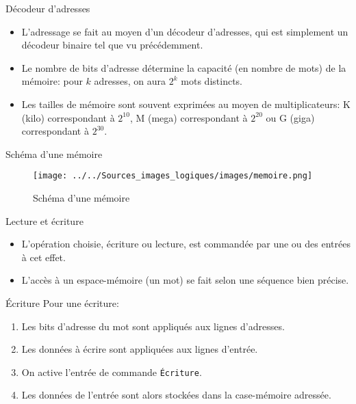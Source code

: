 \documentclass[presentation]{beamer}
\begin{document}
\begin{frame}[label={sec:orgab3ce34}]{Décodeur d'adresses}
\begin{itemize}
\item L'adressage se fait au moyen d'un \alert{décodeur d'adresses}, qui est simplement un décodeur binaire tel que vu précédemment.

\item Le nombre de bits d'adresse détermine la capacité (en nombre de mots) de la mémoire: pour \(k\) adresses, on aura \(2^k\) mots distincts.

\item Les tailles de mémoire sont souvent exprimées au moyen de multiplicateurs: K (kilo) correspondant à \(2^{10}\), M (mega) correspondant à \(2^{20}\) ou G (giga) correspondant à \(2^{30}\).
\end{itemize}
\end{frame}


\begin{frame}[label={sec:orgcf752f1}]{Schéma d'une mémoire}
\begin{figure}[htbp]
\centering
\texttt{[image: ../../Sources\_images\_logiques/images/memoire.png]}
\caption{\label{fig:org5cec4d4}Schéma d'une mémoire}
\end{figure}
\end{frame}

\begin{frame}[label={sec:orgf54d2b2}]{Lecture et écriture}
\begin{itemize}
\item L'opération choisie, écriture ou lecture, est commandée par une ou des entrées à cet effet.

\item L'accès à un espace-mémoire (un mot) se fait selon une séquence bien précise.
\end{itemize}
\end{frame}

\begin{frame}[label={sec:orgef1239b},fragile]{Écriture}
 Pour une écriture:

\begin{enumerate}
\item Les bits d'adresse du mot sont appliqués aux lignes d'adresses.
\item Les données à écrire sont appliquées aux lignes d'entrée.
\item On active l'entrée de commande \texttt{Écriture}.

\item Les données de l'entrée sont alors stockées dans la case-mémoire adressée.
\end{enumerate}
\end{frame}
\end{document}
